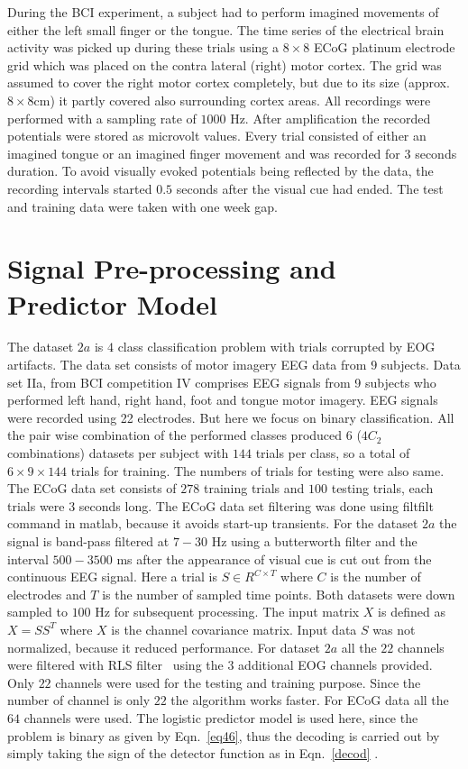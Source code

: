 During the BCI experiment, a subject had to perform imagined movements of either the left small finger or the tongue. The time series of the electrical brain activity was picked up during these trials using a $8 \times 8 $ ECoG platinum electrode grid which was placed on the contra lateral (right) motor cortex. The grid was assumed to cover the right motor cortex completely, but due to its size (approx. $ 8\times 8 $cm) it partly covered also surrounding cortex areas. All recordings were performed with a sampling rate of $1000$ Hz. After amplification the recorded potentials were stored as microvolt values. Every trial consisted of either an imagined tongue or an imagined finger movement and was recorded for $3$ seconds duration. To avoid visually evoked potentials being reflected by the data, the recording intervals started $0.5$ seconds after the visual cue had ended. The test and training data were taken with one week gap.

\section{Signal Pre-processing and Predictor Model}

The dataset $2a$ is $4$ class classification problem with trials corrupted by EOG artifacts. The data set consists of motor imagery EEG data from $9$ subjects. Data set IIa, from BCI competition IV comprises EEG signals from 9 subjects who performed left hand, right hand, foot and tongue motor imagery. EEG signals were recorded using 22 electrodes. But here we focus on binary classification. All the pair wise combination of the performed classes produced 6 ($4C_2$ combinations) datasets per subject with $144$ trials per class, so a total of $6\times 9\times 144  $ trials for training. The numbers of trials for testing were also same. The ECoG data set consists of $278$ training trials and $100$ testing trials, each trials were 3 seconds long. The ECoG data set filtering was done using filtfilt command in matlab, because it avoids start-up transients. For the dataset $2a$ the signal is band-pass filtered at $7-30$ Hz using a butterworth filter and the interval $500-3500$ ms after the appearance of visual cue is cut out from the continuous EEG signal. Here a trial is $ S\in R^{C\times T} $ where $C$ is the number of electrodes and $T$ is the number of sampled time points. Both datasets were down sampled to $100$ Hz for subsequent processing. The input matrix $X$ is defined as $ X=SS^{T} $ where $X$ is the channel covariance matrix. Input data $S$ was not normalized, because it reduced performance. For dataset $2a$ all the $22$ channels were filtered with RLS filter~\cite{33} using the $3$ additional EOG channels provided. Only $22$ channels were used for the testing and training purpose. Since the number of channel is only $22$ the algorithm works faster. For ECoG data all the $64$ channels were used. The logistic predictor model is used here, since the problem is binary as given by Eqn.~\ref{eq46}, thus the decoding is carried out by simply taking the sign of the detector function as in Eqn.~\ref{decod} .

